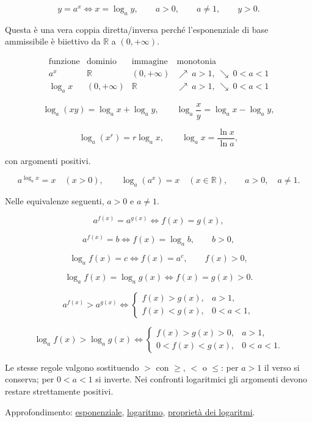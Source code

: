 \[
y=a^x
\Longleftrightarrow
x=\log_a y,
\qquad a>0,
\qquad a\ne1,
\qquad y>0.
\]

Questa è una vera coppia diretta/inversa perché l'esponenziale di base ammissibile è biiettivo da \(\mathbb R\) a \((0,+\infty)\).

\[
\begin{array}{c|c|c|c}
\text{funzione}&\text{dominio}&\text{immagine}&\text{monotonia}\\
\hline
a^x&\mathbb R&(0,+\infty)&\nearrow\ a>1,\ \searrow\ 0<a<1\\
\log_a x&(0,+\infty)&\mathbb R&\nearrow\ a>1,\ \searrow\ 0<a<1
\end{array}
\]

\[
\log_a(xy)=\log_a x+\log_a y,
\qquad
\log_a\frac xy=\log_a x-\log_a y,
\]

\[
\log_a(x^r)=r\log_a x,
\qquad
\log_a x=\frac{\ln x}{\ln a},
\]

con argomenti positivi.

\[
a^{\log_a x}=x\quad(x>0),
\qquad
\log_a(a^x)=x\quad(x\in\mathbb R),
\qquad
a>0,\quad a\ne1.
\]

Nelle equivalenze seguenti, \(a>0\) e \(a\ne1\).

\[
a^{f(x)}=a^{g(x)}
\Longleftrightarrow
f(x)=g(x),
\]

\[
a^{f(x)}=b
\Longleftrightarrow
f(x)=\log_a b,
\qquad b>0,
\]

\[
\log_a f(x)=c
\Longleftrightarrow
f(x)=a^c,
\qquad f(x)>0,
\]

\[
\log_a f(x)=\log_a g(x)
\Longleftrightarrow
f(x)=g(x)>0.
\]

\[
a^{f(x)}>a^{g(x)}
\Longleftrightarrow
\begin{cases}
f(x)>g(x),&a>1,\\
f(x)<g(x),&0<a<1,
\end{cases}
\]

\[
\log_a f(x)>\log_a g(x)
\Longleftrightarrow
\begin{cases}
f(x)>g(x)>0,&a>1,\\
0<f(x)<g(x),&0<a<1.
\end{cases}
\]

Le stesse regole valgono sostituendo \(>\) con \(\ge\), \(<\) o \(\le\): per \(a>1\) il verso si conserva; per \(0<a<1\) si inverte. Nei confronti logaritmici gli argomenti devono restare strettamente positivi.

Approfondimento: \href{https://ingegnerismo.it/matematica/esponenziale/}{esponenziale}, \href{https://ingegnerismo.it/matematica/logaritmo/}{logaritmo}, \href{https://ingegnerismo.it/matematica/proprieta-dei-logaritmi/}{proprietà dei logaritmi}.

